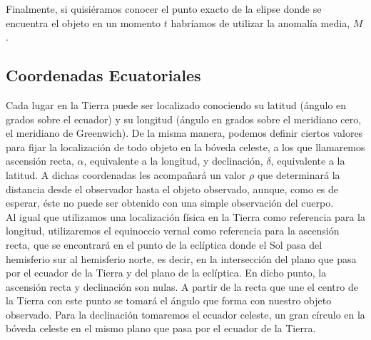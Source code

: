 \documentclass[11pt]{book}
\begin{document}
Finalmente, si quisiéramos conocer el punto exacto de la elipse donde se encuentra el objeto en un momento $t$ habríamos de utilizar la anomalía media, $M$.\\


\subsection{Coordenadas Ecuatoriales}
\label{subsec:equatorial_coordinates}
Cada lugar en la Tierra puede ser localizado conociendo su latitud (ángulo en grados sobre el ecuador) y su longitud (ángulo en grados sobre el meridiano cero, el meridiano de Greenwich). De la misma manera, podemos definir ciertos valores para fijar la localización de todo objeto en la bóveda celeste, a los que llamaremos ascensión recta, $\alpha$, equivalente a la longitud, y declinación, $\delta$, equivalente a la latitud. A dichas coordenadas les acompañará un valor $\rho$ que determinará la distancia desde el observador hasta el objeto observado, aunque, como es de esperar, éste no puede ser obtenido con una simple observación del cuerpo.\\

Al igual que utilizamos una localización física en la Tierra como referencia para la longitud, utilizaremos el equinoccio vernal como referencia para la ascensión recta, que se encontrará en el punto de la eclíptica donde el Sol pasa del hemisferio sur al hemisferio norte, es decir, en la intersección del plano que pasa por el ecuador de la Tierra y del plano de la eclíptica. En dicho punto, la ascensión recta y declinación son nulas. A partir de la recta que une el centro de la Tierra con este punto se tomará el ángulo que forma con nuestro objeto observado. Para la declinación tomaremos el ecuador celeste, un gran círculo en la bóveda celeste en el mismo plano que pasa por el ecuador de la Tierra\cite{right_ascension_declination}.\\
\end{document}
